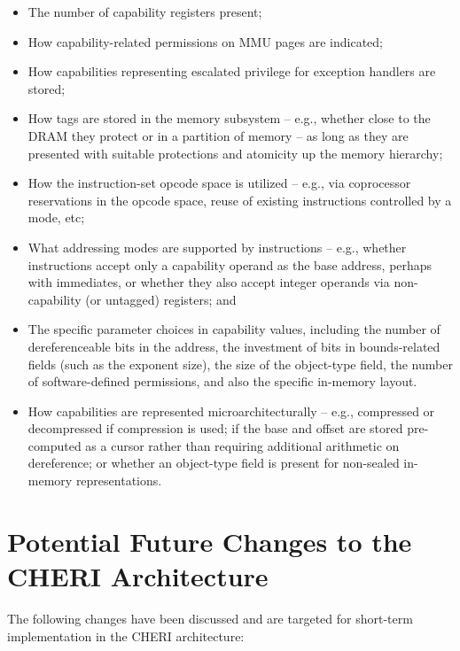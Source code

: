 \begin{itemize}
\item The number of capability registers present;
\item How capability-related permissions on MMU pages are indicated;
\item How capabilities representing escalated privilege for exception
  handlers are stored;
\item How tags are stored in the memory subsystem -- e.g., whether close to
  the DRAM they protect or in a partition of memory -- as long as they are
  presented with suitable protections and atomicity up the memory hierarchy;
\item How the instruction-set opcode space is utilized -- e.g., via
  coprocessor reservations in the opcode space, reuse of existing instructions
  controlled by a mode, etc;
\item What addressing modes are supported by instructions -- e.g., whether
  instructions accept only a capability operand as the base address, perhaps
  with immediates, or whether they also accept integer operands via
  non-capability (or untagged) registers; and
\item The specific parameter choices in capability values, including the
  number of dereferenceable bits in the address, the investment of bits in
  bounds-related fields (such as the exponent size), the size of the
  object-type field, the number of software-defined permissions, and also the
  specific in-memory layout.
\item How capabilities are represented microarchitecturally -- e.g.,
  compressed or decompressed if compression is used; if the base and offset
  are stored pre-computed as a cursor rather than requiring additional
  arithmetic on dereference; or whether an object-type field is present for
  non-sealed in-memory representations.
\end{itemize}

\section{Potential Future Changes to the CHERI Architecture}

The following changes have been discussed and are targeted for short-term
implementation in the CHERI architecture:


